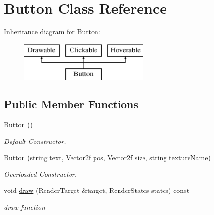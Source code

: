 \hypertarget{class_button}{}\section{Button Class Reference}
\label{class_button}
Inheritance diagram for Button\+:\begin{figure}[H]
\begin{center}
\leavevmode
\includegraphics[height=2.000000cm]{class_button}
\end{center}
\end{figure}
\subsection*{Public Member Functions}
\begin{DoxyCompactItemize}
\item 
\hyperlink{class_button_a3b36df1ae23c58aedb9e15a713159459}{Button} ()
\begin{DoxyCompactList}\small\item\em Default Constructor. \end{DoxyCompactList}\item 
\hyperlink{class_button_ad33024be2e6d0cc53e4f11d70ed01c52}{Button} (string text, Vector2f pos, Vector2f size, string texture\+Name)
\begin{DoxyCompactList}\small\item\em Overloaded Constructor. \end{DoxyCompactList}\item 
void \hyperlink{class_button_ada7ed6bfd73ec8704a5d2247c28f6513}{draw} (Render\+Target \&target, Render\+States states) const
\begin{DoxyCompactList}\small\item\em draw function \end{DoxyCompactList}\end{DoxyCompactItemize}
